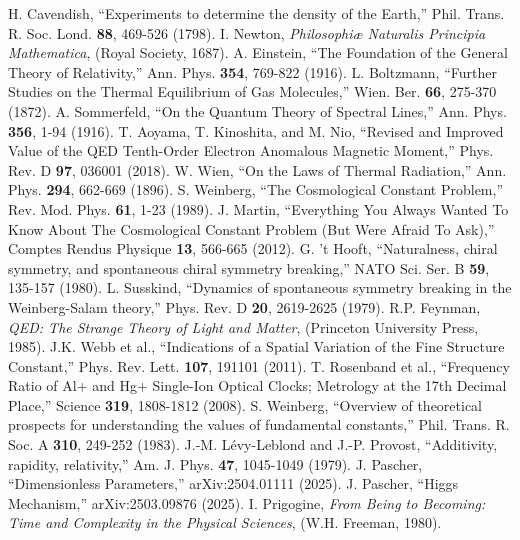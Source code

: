 \documentclass[twocolumn,aps,prl]{revtex4-2}
\begin{document}
\begin{thebibliography}{99}
		 H. Cavendish, ``Experiments to determine the density of the Earth,'' Phil. Trans. R. Soc. Lond. \textbf{88}, 469-526 (1798).
		 I. Newton, \textit{Philosophiæ Naturalis Principia Mathematica}, (Royal Society, 1687).
		 A. Einstein, ``The Foundation of the General Theory of Relativity,'' Ann. Phys. \textbf{354}, 769-822 (1916).
		 L. Boltzmann, ``Further Studies on the Thermal Equilibrium of Gas Molecules,'' Wien. Ber. \textbf{66}, 275-370 (1872).
		 A. Sommerfeld, ``On the Quantum Theory of Spectral Lines,'' Ann. Phys. \textbf{356}, 1-94 (1916).
		 T. Aoyama, T. Kinoshita, and M. Nio, ``Revised and Improved Value of the QED Tenth-Order Electron Anomalous Magnetic Moment,'' Phys. Rev. D \textbf{97}, 036001 (2018).
		 W. Wien, ``On the Laws of Thermal Radiation,'' Ann. Phys. \textbf{294}, 662-669 (1896).
		 S. Weinberg, ``The Cosmological Constant Problem,'' Rev. Mod. Phys. \textbf{61}, 1-23 (1989).
		 J. Martin, ``Everything You Always Wanted To Know About The Cosmological Constant Problem (But Were Afraid To Ask),'' Comptes Rendus Physique \textbf{13}, 566-665 (2012).
		 G. 't Hooft, ``Naturalness, chiral symmetry, and spontaneous chiral symmetry breaking,'' NATO Sci. Ser. B \textbf{59}, 135-157 (1980).
		 L. Susskind, ``Dynamics of spontaneous symmetry breaking in the Weinberg-Salam theory,'' Phys. Rev. D \textbf{20}, 2619-2625 (1979).
		 R.P. Feynman, \textit{QED: The Strange Theory of Light and Matter}, (Princeton University Press, 1985).
		 J.K. Webb et al., ``Indications of a Spatial Variation of the Fine Structure Constant,'' Phys. Rev. Lett. \textbf{107}, 191101 (2011).
		 T. Rosenband et al., ``Frequency Ratio of Al+ and Hg+ Single-Ion Optical Clocks; Metrology at the 17th Decimal Place,'' Science \textbf{319}, 1808-1812 (2008).
		 S. Weinberg, ``Overview of theoretical prospects for understanding the values of fundamental constants,'' Phil. Trans. R. Soc. A \textbf{310}, 249-252 (1983).
		 J.-M. Lévy-Leblond and J.-P. Provost, ``Additivity, rapidity, relativity,'' Am. J. Phys. \textbf{47}, 1045-1049 (1979).
		 J. Pascher, ``Dimensionless Parameters,'' arXiv:2504.01111 (2025).
		 J. Pascher, ``Higgs Mechanism,'' arXiv:2503.09876 (2025).
		 I. Prigogine, \textit{From Being to Becoming: Time and Complexity in the Physical Sciences}, (W.H. Freeman, 1980).

\end{thebibliography}
\end{document}
